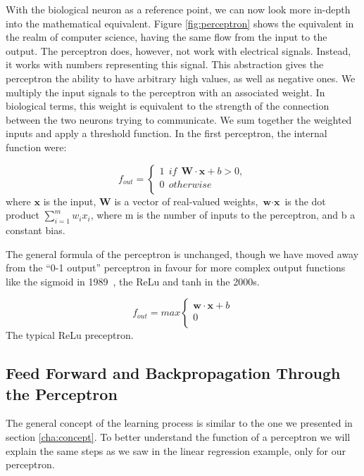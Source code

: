With the biological neuron as a reference point, we can now look more in-depth into the mathematical equivalent. 
Figure \ref{fig:perceptron} shows the equivalent in the realm of computer science, having the same flow from the input to the output. 
The perceptron does, however, not work with electrical signals. Instead, it works with numbers representing this signal. This abstraction gives the perceptron the ability to have arbitrary high values, as well as negative ones. 
We multiply the input signals to the perceptron with an associated weight. In biological terms, this weight is equivalent to the strength of the connection between the two neurons trying to communicate. We sum together the weighted inputs and apply a threshold function. In the first perceptron, the internal function were:


\begin{equation}
    \label{eq:tresh}
 f_{out}=   \left\{
\begin{array}{ll}
		1 \ \ if \ \ \textbf{W} \cdot \textbf{x} + b > 0, \\
     	0 \ \ otherwise \\
\end{array} 
\right. 
\end{equation}
where $\textbf{x}$ is the input, $\textbf{W}$ is a vector of real-valued weights, $\textbf{w} \cdot \textbf{x}$ is the dot product $\sum _{i=1}^{m}w_{i}x_{i}$, where m is the number of inputs to the perceptron, and b a constant bias. 


The general formula of the perceptron is unchanged, though we have moved away from the ``0-1 output'' perceptron in favour for more complex output functions like the sigmoid in 1989~\cite{Funahashi:1989:ARC:71287.71290}, the ReLu and tanh in the 2000s. 

\begin{equation}
    \label{eq:ReLu}
 f_{out}=   max\left\{
\begin{array}{ll}
		\textbf{w} \cdot \textbf{x} + b \\
     	0 \\
\end{array} 
\right. 
\end{equation}
The typical ReLu preceptron.



\subsection{Feed Forward and Backpropagation Through the Perceptron}
The general concept of the learning process is similar to the one we presented in section \ref{cha:concept}. To better understand the function of a perceptron we will explain the same steps as we saw in the linear regression example, only for our perceptron.

